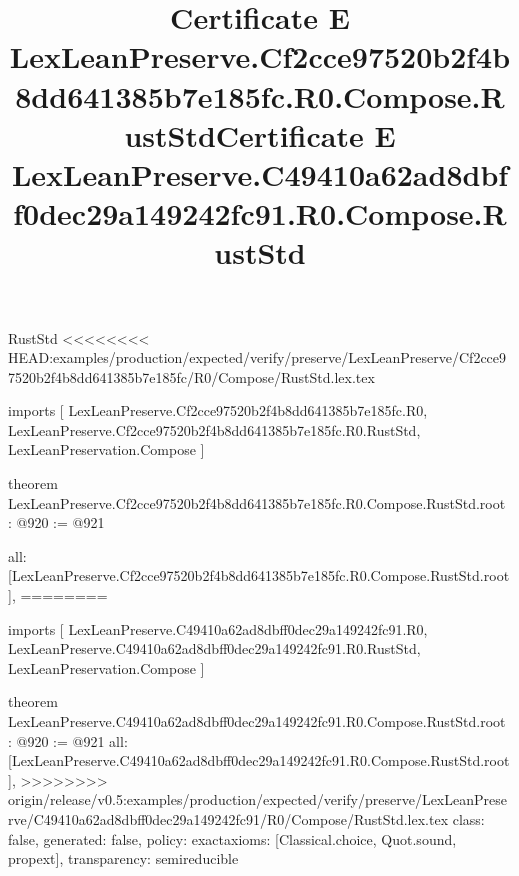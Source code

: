 \begin{lexlean}{RustStd}
<<<<<<<< HEAD:examples/production/expected/verify/preserve/LexLeanPreserve/Cf2cce97520b2f4b8dd641385b7e185fc/R0/Compose/RustStd.lex.tex
\title{Certificate E LexLeanPreserve.Cf2cce97520b2f4b8dd641385b7e185fc.R0.Compose.RustStd}
\begin{coremodule}
imports [
  LexLeanPreserve.Cf2cce97520b2f4b8dd641385b7e185fc.R0,
  LexLeanPreserve.Cf2cce97520b2f4b8dd641385b7e185fc.R0.RustStd,
  LexLeanPreservation.Compose
]

theorem LexLeanPreserve.Cf2cce97520b2f4b8dd641385b7e185fc.R0.Compose.RustStd.root : @920 := @921 {
  all: [LexLeanPreserve.Cf2cce97520b2f4b8dd641385b7e185fc.R0.Compose.RustStd.root],
========
\title{Certificate E LexLeanPreserve.C49410a62ad8dbff0dec29a149242fc91.R0.Compose.RustStd}
\begin{coremodule}
imports [
  LexLeanPreserve.C49410a62ad8dbff0dec29a149242fc91.R0,
  LexLeanPreserve.C49410a62ad8dbff0dec29a149242fc91.R0.RustStd,
  LexLeanPreservation.Compose
]

theorem LexLeanPreserve.C49410a62ad8dbff0dec29a149242fc91.R0.Compose.RustStd.root : @920 := @921 {
  all: [LexLeanPreserve.C49410a62ad8dbff0dec29a149242fc91.R0.Compose.RustStd.root],
>>>>>>>> origin/release/v0.5:examples/production/expected/verify/preserve/LexLeanPreserve/C49410a62ad8dbff0dec29a149242fc91/R0/Compose/RustStd.lex.tex
  class: false,
  generated: false,
  policy: exact{axioms: [Classical.choice, Quot.sound, propext]},
  transparency: semireducible
}


\end{coremodule}}
\end{coremodule}
\end{lexlean}
